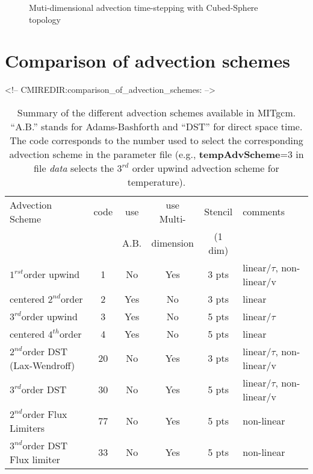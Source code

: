 \begin{figure}
\caption{Muti-dimensional advection time-stepping with Cubed-Sphere topology
\label{fig:advect-multidim_cs}
}
\end{figure}

\section{Comparison of advection schemes}
\label{sect:tracer_advection_schemes}
\begin{rawhtml}
<!-- CMIREDIR:comparison_of_advection_schemes: -->
\end{rawhtml}

\begin{table}[htb]
\centering
 \begin{tabular}[htb]{|l|c|c|c|c|l|}
   \hline
   Advection Scheme & code & use  & use Multi- & Stencil & comments \\
                    &      & A.B. & dimension & (1 dim) & \\
   \hline \hline
   $1^{rst}$order upwind  & 1 &  No & Yes & 3 pts & linear/$\tau$, non-linear/v\\
   \hline
   centered $2^{nd}$order & 2 &  Yes & No & 3 pts & linear \\
   \hline
   $3^{rd}$order upwind   & 3 &  Yes & No & 5 pts & linear/$\tau$\\
   \hline
   centered $4^{th}$order & 4 &  Yes & No & 5 pts & linear \\
   \hline \hline
   $2^{nd}$order DST (Lax-Wendroff)  & 20 &
                         No & Yes & 3 pts & linear/$\tau$, non-linear/v\\
   \hline
   $3^{rd}$order DST & 30 &  No & Yes & 5 pts & linear/$\tau$, non-linear/v\\
   \hline \hline
   $2^{nd}$order Flux Limiters & 77 &  No & Yes & 5 pts & non-linear \\
   \hline
   $3^{nd}$order DST Flux limiter & 33 &  No & Yes & 5 pts & non-linear \\
   \hline
 \end{tabular}
 \caption{Summary of the different advection schemes available in MITgcm.
          ``A.B.'' stands for Adams-Bashforth and ``DST'' for direct space time.
          The code corresponds to the number used to select the corresponding
          advection scheme in the parameter file (e.g., {\bf tempAdvScheme}=3 in
          file {\em data} selects the $3^{rd}$ order upwind advection scheme 
          for temperature).
   }
 \label{tab:advectionShemes_summary}
\end{table}


